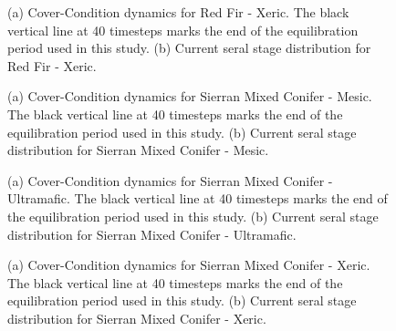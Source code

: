 \begin{figure}[!htbp]
  \centering
  \caption{(a) Cover-Condition dynamics for Red Fir - Xeric. The black vertical line at 40 timesteps marks the end of the equilibration period used in this study. (b) Current seral stage distribution for Red Fir - Xeric.} 
  \label{fig:covcond_rfrx}
\end{figure}

\begin{figure}[!htbp]
  \centering
  \caption{(a) Cover-Condition dynamics for Sierran Mixed Conifer - Mesic. The black vertical line at 40 timesteps marks the end of the equilibration period used in this study. (b) Current seral stage distribution for Sierran Mixed Conifer - Mesic.} 
  \label{fig:covcond_smcm}
\end{figure}

\begin{figure}[!htbp]
  \centering
  \caption{(a) Cover-Condition dynamics for Sierran Mixed Conifer - Ultramafic. The black vertical line at 40 timesteps marks the end of the equilibration period used in this study. (b) Current seral stage distribution for Sierran Mixed Conifer - Ultramafic.} 
  \label{fig:covcond_smcu}
\end{figure}

\begin{figure}[!htbp]
  \centering
  \caption{(a) Cover-Condition dynamics for Sierran Mixed Conifer - Xeric. The black vertical line at 40 timesteps marks the end of the equilibration period used in this study. (b) Current seral stage distribution for Sierran Mixed Conifer - Xeric.} 
  \label{fig:covcond_smcx}
\end{figure}


